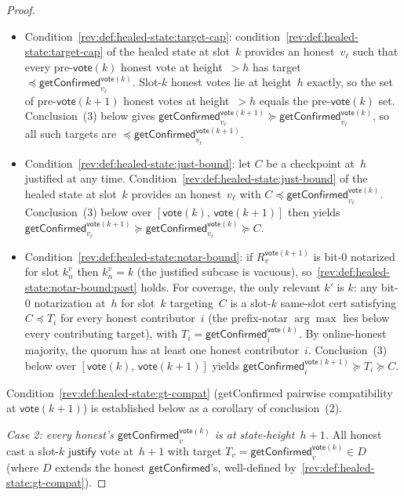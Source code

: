 \ifx\litemode\undefined\documentclass{article}\fi
\newcommand{\just}{\ensuremath{\mathsf{justify}}\xspace}
\newcommand{\vote}{\mathsf{vote}}
\newcommand{\getConfirmed}{\textsf{getConfirmed}\xspace}
\theoremstyle{plain}
\theoremstyle{definition}
\theoremstyle{remark}
\newcommand{\OHM}{online-honest majority\xspace}
\begin{document}
\begin{proof}
\begin{itemize}
  \item Condition~\ref{rev:def:healed-state:target-cap}: condition~\ref{rev:def:healed-state:target-cap} of the healed state at slot~$k$ provides an honest~$v_\ell$ such that every pre-$\vote(k)$ honest vote at height~$>h$ has target~$\preceq \getConfirmed_{v_\ell}^{\vote(k)}$. Slot-$k$ honest votes lie at height~$h$ exactly, so the set of pre-$\vote(k+1)$ honest votes at height~$>h$ equals the pre-$\vote(k)$ set. Conclusion~(3) below gives $\getConfirmed_{v_\ell}^{\vote(k+1)} \succeq \getConfirmed_{v_\ell}^{\vote(k)}$, so all such targets are $\preceq \getConfirmed_{v_\ell}^{\vote(k+1)}$.
  \item Condition~\ref{rev:def:healed-state:just-bound}: let $C$ be a checkpoint at~$h$ justified at any time. Condition~\ref{rev:def:healed-state:just-bound} of the healed state at slot~$k$ provides an honest~$v_\ell$ with $C \preceq \getConfirmed_{v_\ell}^{\vote(k)}$. Conclusion~(3) below over $[\vote(k),\, \vote(k+1)]$ then yields $\getConfirmed_{v_\ell}^{\vote(k+1)} \succeq \getConfirmed_{v_\ell}^{\vote(k)} \succeq C$.
  \item Condition~\ref{rev:def:healed-state:notar-bound}: if $R_v^{\vote(k+1)}$ is bit-$0$ notarized for slot $k_n^v$ then $k_n^v = k$ (the justified subcase is vacuous), so~\ref{rev:def:healed-state:notar-bound:past} holds. For coverage, the only relevant $k'$ is $k$: any bit-$0$ notarization at~$h$ for slot~$k$ targeting~$C$ is a slot-$k$ same-slot cert satisfying $C \preceq T_i$ for every honest contributor~$i$ (the prefix-notar $\arg\max$ lies below every contributing target), with $T_i = \getConfirmed_i^{\vote(k)}$. By \OHM, the quorum has at least one honest contributor~$i$. Conclusion~(3) below over $[\vote(k),\, \vote(k+1)]$ yields $\getConfirmed_i^{\vote(k+1)} \succeq T_i \succeq C$.
\end{itemize}
Condition~\ref{rev:def:healed-state:gt-compat} (\getConfirmed{} pairwise compatibility at $\vote(k+1)$) is established below as a corollary of conclusion~(2).

\emph{Case 2: every honest's $\getConfirmed_v^{\vote(k)}$ is at state-height~$h+1$.}
All honest cast a slot-$k$ \just vote at~$h+1$ with target $T_v = \getConfirmed_v^{\vote(k)} \in D$ (where $D$ extends the honest $\getConfirmed$'s, well-defined by~\ref{rev:def:healed-state:gt-compat}).


\end{proof}
\end{document}
